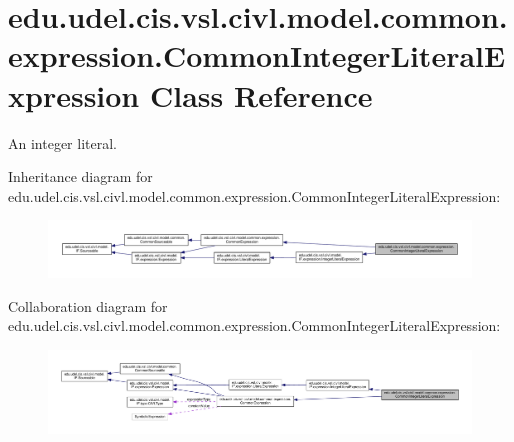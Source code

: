 \hypertarget{classedu_1_1udel_1_1cis_1_1vsl_1_1civl_1_1model_1_1common_1_1expression_1_1CommonIntegerLiteralExpression}{}\section{edu.\+udel.\+cis.\+vsl.\+civl.\+model.\+common.\+expression.\+Common\+Integer\+Literal\+Expression Class Reference}
\label{classedu_1_1udel_1_1cis_1_1vsl_1_1civl_1_1model_1_1common_1_1expression_1_1CommonIntegerLiteralExpression}


An integer literal.  




Inheritance diagram for edu.\+udel.\+cis.\+vsl.\+civl.\+model.\+common.\+expression.\+Common\+Integer\+Literal\+Expression\+:
\nopagebreak
\begin{figure}[H]
\begin{center}
\leavevmode
\includegraphics[width=350pt]{classedu_1_1udel_1_1cis_1_1vsl_1_1civl_1_1model_1_1common_1_1expression_1_1CommonIntegerLiteralExpression__inherit__graph}
\end{center}
\end{figure}


Collaboration diagram for edu.\+udel.\+cis.\+vsl.\+civl.\+model.\+common.\+expression.\+Common\+Integer\+Literal\+Expression\+:
\nopagebreak
\begin{figure}[H]
\begin{center}
\leavevmode
\includegraphics[width=350pt]{classedu_1_1udel_1_1cis_1_1vsl_1_1civl_1_1model_1_1common_1_1expression_1_1CommonIntegerLiteralExpression__coll__graph}
\end{center}
\end{figure}
